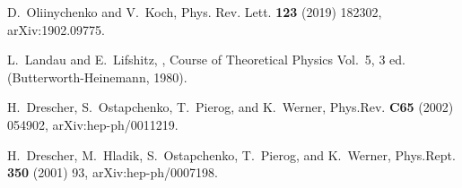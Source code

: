 \documentclass[secnumarabic, graphics,floatfix, nofootinbib,tightenlines,nobibnotes, aps, prl, 12pt]{revtex4-1}
\begin{document}
\begin{thebibliography}{10}
D.~Oliinychenko and V.~Koch,
\newblock Phys. Rev. Lett. {\bf 123} (2019) 182302, arXiv:1902.09775.

L.~Landau and E.~Lifshitz,
, Course of Theoretical Physics
  Vol.~5, 3 ed. (Butterworth-Heinemann, 1980).

H.~Drescher, S.~Ostapchenko, T.~Pierog, and K.~Werner,
\newblock Phys.Rev. {\bf C65} (2002) 054902, arXiv:hep-ph/0011219.

H.~Drescher, M.~Hladik, S.~Ostapchenko, T.~Pierog, and K.~Werner,
\newblock Phys.Rept. {\bf 350} (2001) 93, arXiv:hep-ph/0007198.

\end{thebibliography}
 
\end{document}
